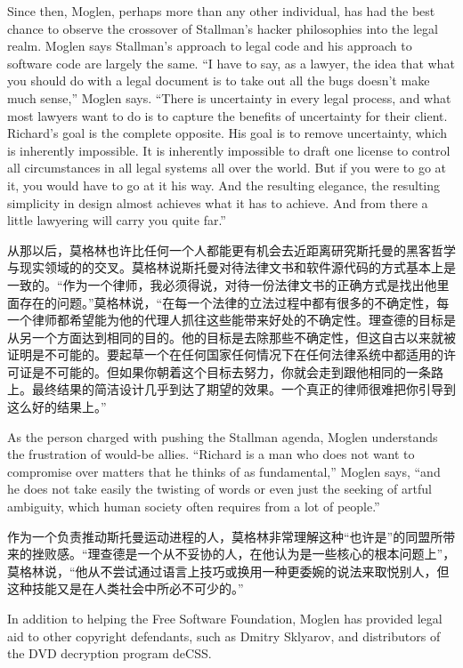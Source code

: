 \ifdefined\eng
Since then, Moglen, perhaps more than any other individual, has had the best chance to observe the crossover of Stallman's hacker philosophies into the legal realm. Moglen says Stallman's approach to legal code and his approach to software code are largely the same. ``I have to say, as a lawyer, the idea that what you should do with a legal document is to take out all the bugs doesn't make much sense,'' Moglen says. ``There is uncertainty in every legal process, and what most lawyers want to do is to capture the benefits of uncertainty for their client. Richard's goal is the complete opposite. His goal is to remove uncertainty, which is inherently impossible. It is inherently impossible to draft one license to control all circumstances in all legal systems all over the world. But if you were to go at it, you would have to go at it his way. And the resulting elegance, the resulting simplicity in design almost achieves what it has to achieve. And from there a little lawyering will carry you quite far.''
\fi

\ifdefined\chs
从那以后，莫格林也许比任何一个人都能更有机会去近距离研究斯托曼的黑客哲学与现实领域的的交叉。莫格林说斯托曼对待法律文书和软件源代码的方式基本上是一致的。“作为一个律师，我必须得说，对待一份法律文书的正确方式是找出他里面存在的问题。”莫格林说，“在每一个法律的立法过程中都有很多的不确定性，每一个律师都希望能为他的代理人抓往这些能带来好处的不确定性。理查德的目标是从另一个方面达到相同的目的。他的目标是去除那些不确定性，但这自古以来就被证明是不可能的。要起草一个在任何国家任何情况下在任何法律系统中都适用的许可证是不可能的。但如果你朝着这个目标去努力，你就会走到跟他相同的一条路上。最终结果的简洁设计几乎到达了期望的效果。一个真正的律师很难把你引导到这么好的结果上。”
\fi

\ifdefined\eng
As the person charged with pushing the Stallman agenda, Moglen understands the frustration of would-be allies. ``Richard is a man who does not want to compromise over matters that he thinks of as fundamental,'' Moglen says, ``and he does not take easily the twisting of words or even just the seeking of artful ambiguity, which human society often requires from a lot of people.''
\fi

\ifdefined\chs
作为一个负责推动斯托曼运动进程的人，莫格林非常理解这种“也许是”的同盟所带来的挫败感。“理查德是一个从不妥协的人，在他认为是一些核心的根本问题上”，莫格林说，“他从不尝试通过语言上技巧或换用一种更委婉的说法来取悦别人，但这种技能又是在人类社会中所必不可少的。”
\fi

\ifdefined\eng
In addition to helping the Free Software Foundation, Moglen has provided legal aid to other copyright defendants, such as Dmitry Sklyarov, and distributors of the DVD decryption program deCSS.
\fi

